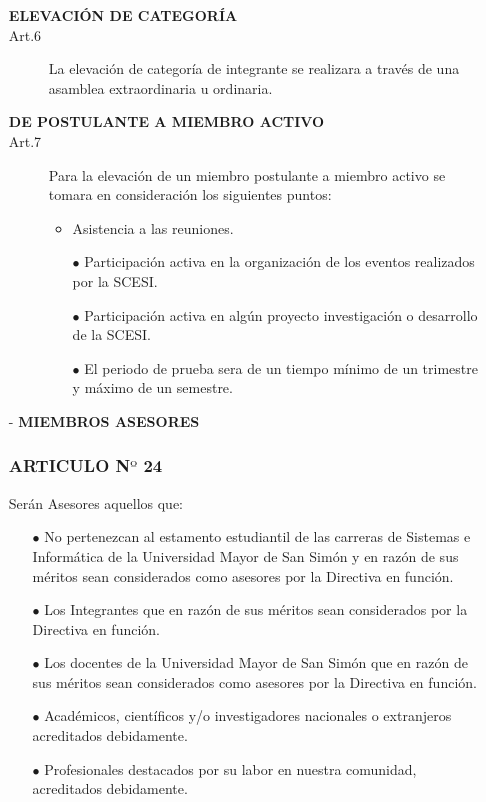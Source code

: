 \documentclass[letterpaper,11pt]{book}
\begin{document}
\begin{itemize}
\begin{description}
\item[{\bf ELEVACIÓN DE CATEGORÍA}]
\item[Art.6] La elevación de categoría de integrante se realizara a través de una asamblea 	extraordinaria u ordinaria.
\item[{\bf DE POSTULANTE A MIEMBRO ACTIVO}]
\item[Art.7] Para la elevación de un miembro postulante a miembro activo se tomara en consideración los siguientes puntos:
\begin{itemize}
\item Asistencia a las reuniones.
\item[$\bullet$] Participación activa en la organización de los eventos realizados por la SCESI. 
\item[$\bullet$] Participación activa en algún proyecto investigación o desarrollo de la SCESI. 
\item[$\bullet$] El periodo de prueba sera de un tiempo mínimo de un trimestre y máximo de un semestre.
\end{itemize}
\end{description}
\item[-] {\bf MIEMBROS ASESORES}
\subsubsection*{ARTICULO N$º$ 24}
Serán Asesores aquellos que:
\begin{itemize}
\item[$\bullet$] No pertenezcan al estamento estudiantil de las carreras de Sistemas e Informática de la Universidad Mayor de San Simón y en razón de sus méritos sean considerados como asesores por la Directiva en función. 
\item[$\bullet$] Los Integrantes que en razón de sus méritos sean considerados por la Directiva en función.
\item[$\bullet$] Los docentes de la Universidad Mayor de San Simón que en razón de sus méritos sean considerados como asesores por la Directiva en función.
\item[$\bullet$] Académicos, científicos y/o investigadores nacionales o extranjeros acreditados debidamente. 
\item[$\bullet$] Profesionales destacados por su labor en nuestra comunidad, acreditados debidamente. 
\end{itemize}


\end{itemize}
\end{document}
